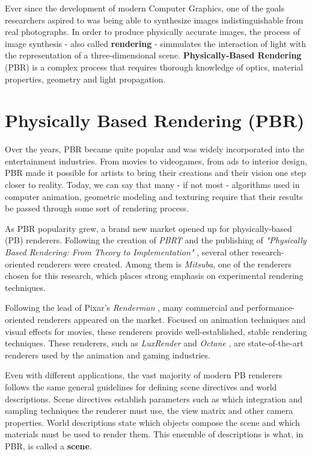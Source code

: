 \documentclass[cic,tc,english]{iiufrgs}
\begin{document}
Ever since the development of modern Computer Graphics, one of the goals 
researchers aspired to was being able to synthesize images indistinguishable 
from real photographs. In order to produce physically accurate images, the 
process of image synthesis - also called \textbf{rendering} - simmulates the 
interaction of light with the representation of a three-dimensional scene. 
\textbf{Physically-Based Rendering} (PBR) is a complex process that requires 
thorough knowledge of optics, material properties, geometry and light 
propagation.

\section{Physically Based Rendering (PBR)}
Over the years, PBR became quite popular and was widely incorporated into the 
entertainment industries. From movies to videogames, from ads to interior 
design, PBR made it possible for artists to bring their creations and their 
vision one step closer to reality. Today, we can say that many - if not most - 
algorithms used in computer animation, geometric modeling and texturing require 
that their results be passed through some sort of rendering process. 

As PBR popularity grew, a brand new market opened up for physically-based (PB) 
renderers. Following the creation of \textit{PBRT} and the publishing of 
\textit{"Physically Based Rendering: From Theory to Implementation"} 
\cite{pbrt}, several other research-oriented renderers were created. Among them 
is \textit{Mitsuba}, one of the renderers chosen for this research, which places 
strong emphasis on experimental rendering techniques.

Following the lead of Pixar's \textit{Renderman} \cite{renderman}, many 
commercial and performance-oriented renderers appeared on the market. Focused 
on animation techniques and visual effects for movies, these 
renderers provide well-established, stable rendering techniques. These 
renderers, such as \textit{LuxRender} \cite{luxrender} and \textit{Octane} 
\cite{octane}, are state-of-the-art renderers used by the animation and gaming 
industries. 

Even with different applications, the vast majority of modern 
PB renderers follows the same general guidelines for defining scene directives 
and world descriptions. Scene directives establish parameters such as which 
integration and sampling techniques the renderer must use, the view matrix and 
other camera properties. World descriptions state which objects compose the 
scene and which materials must be used to render them. This ensemble of 
descriptions is what, in PBR, is called a \textbf{scene}.
\end{document}
